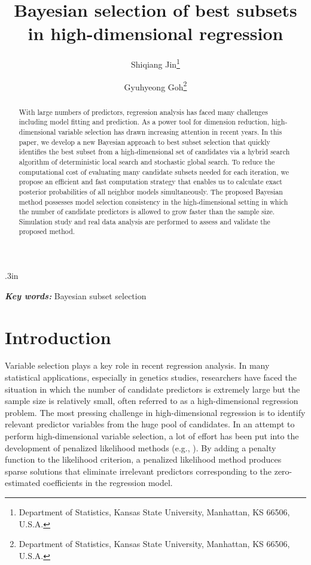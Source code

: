\documentclass[12pt]{article}
\title{\LARGE\bf Bayesian selection of best subsets in high-dimensional regression}
\author{ Shiqiang Jin\thanks{Department of Statistics, Kansas State University, Manhattan, KS 66506, U.S.A.} \and Gyuhyeong Goh\thanks{Department of Statistics, Kansas State University, Manhattan, KS 66506, U.S.A.} }
\providecommand{\keywords}[1]{\textbf{\textit{Key words:}} #1}
\begin{document}
\baselineskip .3in
\maketitle

\begin{abstract}
With large numbers of predictors, regression analysis has faced many challenges including model fitting and prediction. As a power tool for dimension reduction, high-dimensional variable selection has drawn increasing attention in recent years. In this paper, we develop a new Bayesian approach to best subset selection that quickly identifies the best subset from a high-dimensional set of candidates via a hybrid search algorithm of deterministic local search and stochastic global search. To reduce the computational cost of evaluating many candidate subsets needed for each iteration, we propose an efficient and fast computation strategy that enables us to calculate exact posterior probabilities of all neighbor models simultaneously. The proposed Bayesian method possesses model selection consistency in the high-dimensional setting in which the number of candidate predictors is allowed to grow faster than the sample size. Simulation study and real data analysis are performed to assess and validate the proposed method.
\end{abstract}

\keywords{Bayesian subset selection}

\section{Introduction}
Variable selection plays a key role in recent regression analysis. In many statistical applications, especially in genetics studies, researchers have faced the situation in which the number of candidate predictors is extremely large but the sample size is relatively small, often referred to as a high-dimensional regression problem. The most pressing challenge in high-dimensional regression is to identify relevant predictor variables from the huge pool of candidates. In an attempt to perform high-dimensional variable selection, a lot of effort has been put into the development of penalized likelihood methods (e.g., \citealt{tibshirani1996regression, fan2001variable, zou2005regularization, zhang2010nearly}). By adding a penalty function to the likelihood criterion, a penalized likelihood method produces sparse solutions that eliminate irrelevant predictors corresponding to the zero-estimated coefficients in the regression model. 
\end{document}
